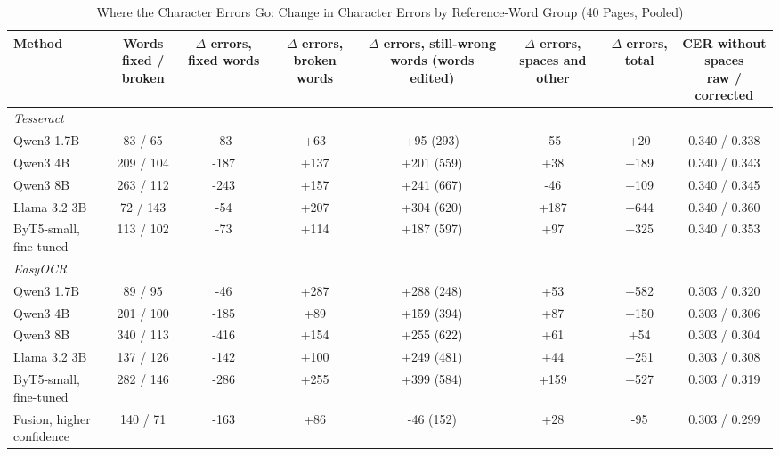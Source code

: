 \begin{table}[t]
\centering
\caption{Where the Character Errors Go: Change in Character Errors by Reference-Word Group (40 Pages, Pooled)}
\label{tab:editlevel}
\setlength{\tabcolsep}{4pt}
\footnotesize
\begin{tabular}{lccccccc}
\toprule
Method & \shortstack{Words\\fixed / broken} & \shortstack{$\Delta$ errors,\\fixed words} & \shortstack{$\Delta$ errors,\\broken words} & \shortstack{$\Delta$ errors, still-wrong\\words (words edited)} & \shortstack{$\Delta$ errors,\\spaces and other} & \shortstack{$\Delta$ errors,\\total} & \shortstack{CER without spaces\\raw / corrected} \\
\midrule
\multicolumn{8}{l}{\textit{Tesseract}} \\
Qwen3 1.7B & 83 / 65 & -83 & +63 & +95 (293) & -55 & +20 & 0.340 / 0.338 \\
Qwen3 4B & 209 / 104 & -187 & +137 & +201 (559) & +38 & +189 & 0.340 / 0.343 \\
Qwen3 8B & 263 / 112 & -243 & +157 & +241 (667) & -46 & +109 & 0.340 / 0.345 \\
Llama 3.2 3B & 72 / 143 & -54 & +207 & +304 (620) & +187 & +644 & 0.340 / 0.360 \\
ByT5-small, fine-tuned & 113 / 102 & -73 & +114 & +187 (597) & +97 & +325 & 0.340 / 0.353 \\
\midrule
\multicolumn{8}{l}{\textit{EasyOCR}} \\
Qwen3 1.7B & 89 / 95 & -46 & +287 & +288 (248) & +53 & +582 & 0.303 / 0.320 \\
Qwen3 4B & 201 / 100 & -185 & +89 & +159 (394) & +87 & +150 & 0.303 / 0.306 \\
Qwen3 8B & 340 / 113 & -416 & +154 & +255 (622) & +61 & +54 & 0.303 / 0.304 \\
Llama 3.2 3B & 137 / 126 & -142 & +100 & +249 (481) & +44 & +251 & 0.303 / 0.308 \\
ByT5-small, fine-tuned & 282 / 146 & -286 & +255 & +399 (584) & +159 & +527 & 0.303 / 0.319 \\
Fusion, higher confidence & 140 / 71 & -163 & +86 & -46 (152) & +28 & -95 & 0.303 / 0.299 \\
\bottomrule
\end{tabular}
\par\smallskip

\end{table}
